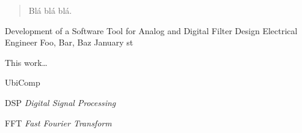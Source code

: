 \documentclass[tg]{mdtufsm}
\begin{document}
\begin{abstract}
Blá blá blá.
\end{abstract}

\begin{englishabstract}
{Development of a Software Tool for Analog and Digital Filter Design}
{Electrical Engineer}
{Foo, Bar, Baz}
{January}
{st}

This work\dots
\end{englishabstract}


\listoffigures

\listoftables


\listofannex

\begin{listofabbrv}{UbiComp}
\item [DSP] \textit{Digital Signal Processing}
\item[FFT] \textit{Fast Fourier Transform}
\end{listofabbrv}
\end{document}
